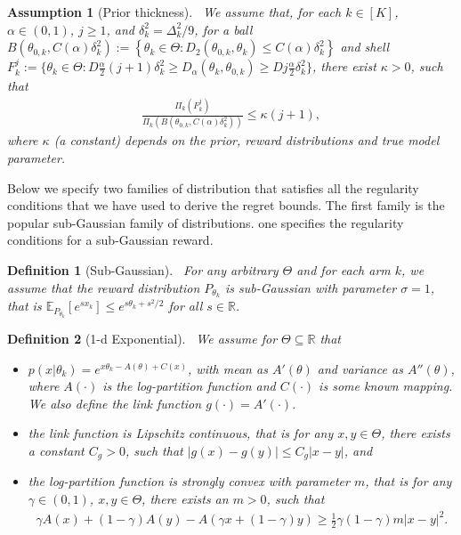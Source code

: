 \documentclass[10pt,a4paper]{amsart}
\newtheorem{assumption}{Assumption}
\newtheorem{definition}{Definition}
\def\bbE{\mathbb E}
\def\bbR{\mathbb R}
\begin{document}
\begin{assumption}[Prior thickness]~\label{ass:prior2}
            We assume that, for each $k\in[K]$, $\alpha\in(0,1)$, $j\geq 1$, and $\delta_k^2=\Delta_k^2/9$, for  a ball $B\left(\theta_{0,k}, C(\alpha)\delta_k^2 \right) := \left\{  \theta_k \in \Theta:D_2(\theta_{0,k},\theta_k)\leq  C(\alpha)\delta_k^2 \right\} $ and shell $F_k^j:= \big\{\theta_k \in \Theta: D\frac{\alpha}{2} (j+1) \delta_k^2 \geq D_{\alpha}(\theta_k,\theta_{0,k}) \geq D j \frac{\alpha}{2} \delta_k^2  \big\}$, there exist $\kappa > 0$, such that 
        \begin{align}\tag{B1} \frac{\Pi_k(F_k^j)}{\Pi_k(B\left(\theta_{0,k},C(\alpha)\delta_k^2 \right) )} \leq \kappa(j+1),
            \end{align}
        where $\kappa$ (a constant) depends on the prior, reward distributions and true model parameter.
        \end{assumption}

Below we specify two families of distribution that satisfies all the regularity conditions that we have used to derive the regret bounds.  The first family is the popular sub-Gaussian family of distributions. one specifies the regularity conditions for a sub-Gaussian reward. \begin{definition}[Sub-Gaussian]~\label{def:SubReward}
   For any arbitrary $\Theta$ and for each arm $k$, we assume that
    the reward distribution $P_{\theta_k}$ is sub-Gaussian with parameter $\sigma=1$, that is $\bbE_{P_{\theta_k}} [e^{s x_k}] \leq e^{s \theta_k + s^2/2}$ for all $s\in \bbR$.
    \end{definition}

    \begin{definition}[1-d Exponential]~\label{def:rewardExp}
        We assume for $\Theta \subseteq \bbR$ that 
        \begin{itemize}
            \item[i.] $p(x|\theta_k) = e^{x \theta_k   -  A(\theta) + C(x) }$, with mean as $ A'(\theta)$ and variance as $A''( \theta)$, where $A(\cdot)$ is the log-partition function and $C(\cdot)$ is some known mapping. We also define the link function $g(\cdot)=A'(\cdot)$.  
            \item[ii.] the link function is Lipschitz continuous, that is for any $x,y\in \Theta$, there exists a constant $C_g>0$, such that
             $   |g(x)-g(y)|\leq C_g|x-y|$, and
            \item[iii.] the log-partition function is strongly convex with parameter $m$, that is for any $\gamma\in (0,1)$, $x,y\in \Theta$, there exists an $m>0$, such that
            \begin{align*}
                \gamma A(x) + (1-\gamma)A(y ) - A(\gamma x + (1-\gamma)y ) 
                \geq \frac{1}{2} \gamma (1-\gamma) m |x-y|^2.
            \end{align*}
        \end{itemize}
    \end{definition} 
\end{document}
